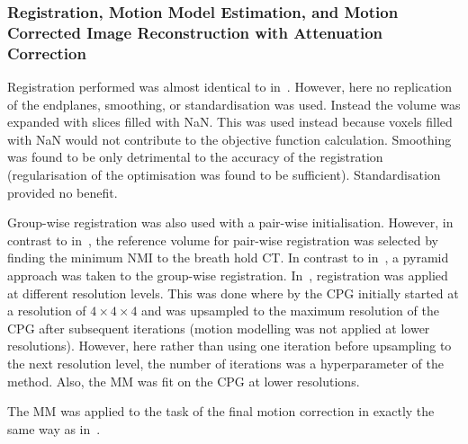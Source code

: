             \subsubsection{Registration, Motion Model Estimation, and Motion Corrected Image Reconstruction with Attenuation Correction} \label{sec:evaluation_of_pet_ct_motion_correction_incorporating_motion_models_using_mlacf_and_complex_gating_schemes_methods_registration_motion_model_estimation_and_motion_corrected_image_reconstruction_with_attenuation_correction}
                Registration performed was almost identical to in~. However, here no replication of the endplanes, smoothing, or standardisation was used. Instead the volume was expanded with slices filled with \gls{NaN}. This was used instead because voxels filled with \gls{NaN} would not contribute to the objective function calculation. Smoothing was found to be only detrimental to the accuracy of the registration (regularisation of the optimisation was found to be sufficient). Standardisation provided no benefit.

                Group-wise registration was also used with a pair-wise initialisation. However, in contrast to in~, the reference volume for pair-wise registration was selected by finding the minimum \gls{NMI} to the breath hold \gls{CT}. In contrast to in~, a pyramid approach was taken to the group-wise registration. In~, registration was applied at different resolution levels. This was done where by the \gls{CPG} initially started at a resolution of $4\times4\times4$ and was upsampled to the maximum resolution of the \gls{CPG} after subsequent iterations (motion modelling was not applied at lower resolutions). However, here rather than using one iteration before upsampling to the next resolution level, the number of iterations was a hyperparameter of the method. Also, the \gls{MM} was fit on the \gls{CPG} at lower resolutions.
                
                The \gls{MM} was applied to the task of the final motion correction in exactly the same way as in~.
            
